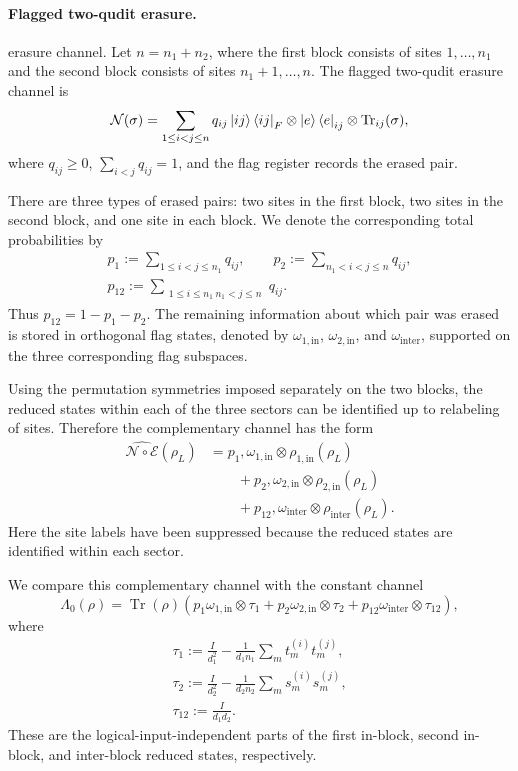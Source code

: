 \documentclass[10pt,twocolumn,superscriptaddress,aps,amsmath,amssymb,citeautoscript,floatfix,prx,longbibliography]{revtex4-2}
\theoremstyle{plain}
\theoremstyle{plain}
\theoremstyle{plain}
\theoremstyle{plain}
\theoremstyle{plain}
\theoremstyle{plain}
\begin{document}
\paragraph{Flagged two-qudit erasure.}

 erasure channel. Let $n=n_1+n_2$, where the first block consists of sites $1,\ldots,n_1$ and the second block consists of sites $n_1+1,\ldots,n$. The flagged two-qudit erasure channel is
$$
\mathcal N(\sigma)
=
\sum_{1\le i<j\le n}
q_{ij}
\ket{ij}\bra{ij}_F
\otimes
\ket e\bra e_{ij}
\otimes
\operatorname{Tr}_{ij}(\sigma),
$$
where $q_{ij}\ge 0$, $\sum_{i<j}q_{ij}=1$, and the flag register records the erased pair.

There are three types of erased pairs: two sites in the first block, two sites in the second block, and one site in each block. We denote the corresponding total probabilities by
$$
\begin{gathered}
p_1
:=
\sum_{1\le i<j\le n_1}
q_{ij},
\qquad
p_2
:=
\sum_{n_1<i<j\le n}
q_{ij},
\\
p_{12}
:=
\sum_{\substack{1\le i\le n_1\ n_1<j\le n}}
q_{ij}.
\end{gathered}
$$
Thus $p_{12}=1-p_1-p_2$. The remaining information about which pair was erased is stored in orthogonal flag states, denoted by $\omega_{1,\mathrm{in}}$, $\omega_{2,\mathrm{in}}$, and $\omega_{\mathrm{inter}}$, supported on the three corresponding flag subspaces.

Using the permutation symmetries imposed separately on the two blocks, the reduced states within each of the three sectors can be identified up to relabeling of sites. Therefore the complementary channel has the form
$$
\begin{aligned}
\widehat{\mathcal N\circ\mathcal E}(\rho_L)
&=
p_1,
\omega_{1,\mathrm{in}}
\otimes
\rho_{1,\mathrm{in}}(\rho_L)
\\
&\qquad
+
p_2,
\omega_{2,\mathrm{in}}
\otimes
\rho_{2,\mathrm{in}}(\rho_L)
\\
&\qquad
+
p_{12},
\omega_{\mathrm{inter}}
\otimes
\rho_{\mathrm{inter}}(\rho_L).
\end{aligned}
$$
Here the site labels have been suppressed because the reduced states are identified within each sector.

We compare this complementary channel with the constant channel
$$
\Lambda_0(\rho)
=
\operatorname{Tr}(\rho)
\left(
p_1\omega_{1,\mathrm{in}}\otimes\tau_1
+
p_2\omega_{2,\mathrm{in}}\otimes\tau_2
+
p_{12}\omega_{\mathrm{inter}}\otimes\tau_{12}
\right),
$$
where
$$
\begin{gathered}
\tau_1
:=
\frac{I}{d_1^2}
-
\frac{1}{d_1n_1}
\sum_m t_m^{(i)}t_m^{(j)},
\\
\tau_2
:=
\frac{I}{d_2^2}
-
\frac{1}{d_2n_2}
\sum_m s_m^{(i)}s_m^{(j)},
\\
\tau_{12}
:=
\frac{I}{d_1d_2}.
\end{gathered}
$$
These are the logical-input-independent parts of the first in-block, second in-block, and inter-block reduced states, respectively.
\end{document}
